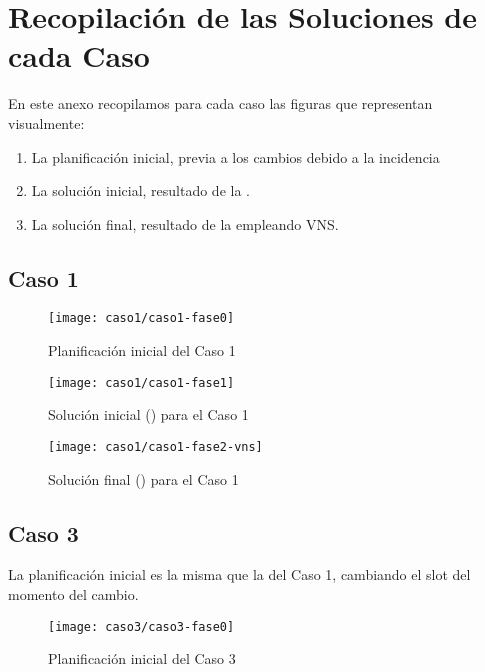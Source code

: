 \graphicspath{{anexos/AnexoF-Recopilacion-Soluciones-Por-Fases/recursos/}}

\section{Recopilación de las Soluciones de cada Caso} \label{Anexo:recopilacion-soluciones-por-fases}

En este anexo recopilamos para cada caso las figuras que representan visualmente:
\begin{enumerate}
	\item La planificación inicial, previa a los cambios debido a la incidencia
	\item La solución inicial, resultado de la \faseuno{}.
	\item La solución final, resultado de la \fasedos{} empleando VNS. 
\end{enumerate}


\newpage
\subsection{Caso 1}

\begin{figure}[!h]
	\centering
	\texttt{[image: caso1/caso1-fase0]}
	\caption{Planificación inicial del Caso 1}
	\label{fig:caso1-fase0}
\end{figure}

\begin{figure}[!h]
	\centering
	\texttt{[image: caso1/caso1-fase1]}
	\caption{Solución inicial (\faseuno{}) para el Caso 1}
	\label{fig:caso1-fase1}
\end{figure}

\begin{figure}[!h]
	\centering
	\texttt{[image: caso1/caso1-fase2-vns]}
	\caption{Solución final (\fasedos{}) para el Caso 1}
	\label{fig:caso1-fase2}
\end{figure}

\FloatBarrier
\newpage
\subsection{Caso 3}

La planificación inicial es la misma que la del Caso 1, cambiando el slot del momento del cambio.

\begin{figure}[!h]
	\centering
	\texttt{[image: caso3/caso3-fase0]}
	\caption{Planificación inicial del Caso 3}
	\label{fig:caso3-fase0}
\end{figure}

